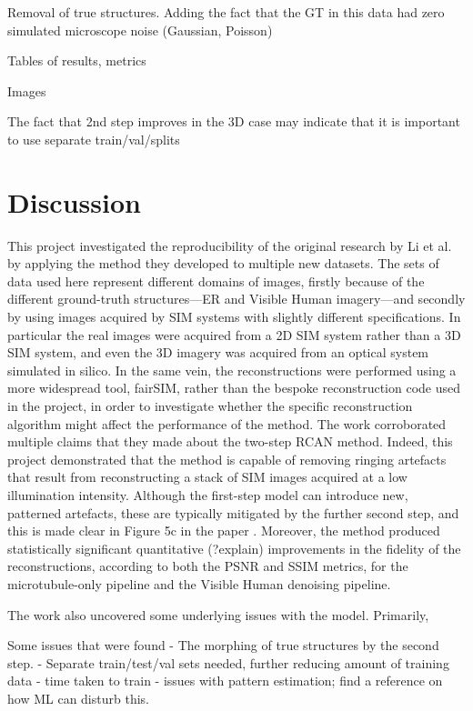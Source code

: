 \documentclass[12pt]{article}
\begin{document}
Removal of true structures. Adding the fact that the GT in this data had zero simulated microscope noise (Gaussian, Poisson)

Tables of results, metrics

Images

The fact that 2nd step improves in the 3D case may indicate that it is important to use separate train/val/splits



\section{Discussion}

This project investigated the reproducibility of the original research by Li et al. by applying the method they developed to multiple new datasets.
The sets of data used here represent different domains of images,
firstly because of the different ground-truth structures---ER and Visible Human imagery---and secondly
by using images acquired by SIM systems with slightly different specifications.
In particular the real images were acquired from a 2D SIM system rather than a 3D SIM system,
and even the 3D imagery was acquired from an optical system simulated in silico.
In the same vein, the reconstructions were performed using a more widespread tool, fairSIM,
rather than the bespoke reconstruction code used in the project,
in order to investigate whether the specific reconstruction algorithm might affect the performance of the method.
The work corroborated multiple claims that they made about the two-step RCAN method.
Indeed, this project demonstrated that the method is capable of removing ringing artefacts that result from reconstructing a stack of SIM images acquired at a low illumination intensity.
Although the first-step model can introduce new, patterned artefacts, these are typically mitigated by the further second step,
and this is made clear in Figure 5c in the paper \cite{keypaper}.
Moreover, the method produced statistically significant quantitative (?explain) improvements in the fidelity of the reconstructions,
according to both the PSNR and SSIM metrics, for the microtubule-only pipeline and the Visible Human denoising pipeline.

The work also uncovered some underlying issues with the model.
Primarily,

Some issues that were found
- The morphing of true structures by the second step.
- Separate train/test/val sets needed, further reducing amount of training data
- time taken to train
- issues with pattern estimation; find a reference on how ML can disturb this.
\end{document}
